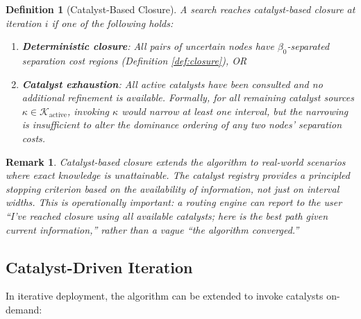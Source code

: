 \documentclass[twocolumn,11pt,a4paper]{article}
\newtheorem{definition}[theorem]{Definition}
\newtheorem{remark}[theorem]{Remark}
\theoremstyle{definition}
\begin{document}
\begin{definition}[Catalyst-Based Closure]
\label{def:catalyst_closure}
A search reaches \emph{catalyst-based closure} at iteration $i$ if one of the following holds:

\begin{enumerate}
\item \textbf{Deterministic closure}: All pairs of uncertain nodes have $\beta_0$-separated separation cost regions (Definition \ref{def:closure}), OR
\item \textbf{Catalyst exhaustion}: All active catalysts have been consulted and no additional refinement is available. Formally, for all remaining catalyst sources $\kappa \in \mathcal{K}_{\text{active}}$, invoking $\kappa$ would narrow at least one interval, but the narrowing is insufficient to alter the dominance ordering of any two nodes' separation costs.
\end{enumerate}
\end{definition}

\begin{remark}
Catalyst-based closure extends the algorithm to real-world scenarios where exact knowledge is unattainable. The catalyst registry provides a \emph{principled stopping criterion} based on the availability of information, not just on interval widths. This is operationally important: a routing engine can report to the user ``I've reached closure using all available catalysts; here is the best path given current information,'' rather than a vague ``the algorithm converged.''
\end{remark}

\subsection{Catalyst-Driven Iteration}

In iterative deployment, the algorithm can be extended to invoke catalysts on-demand:
\end{document}
